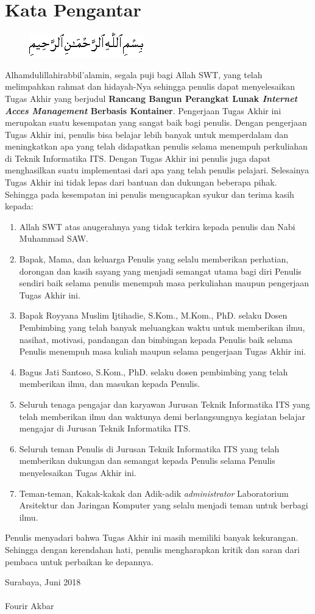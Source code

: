 \chapter{Kata Pengantar}
		\begin{figure}[h]
			\centering
			\includegraphics[width=0.5\linewidth]{img/bismillah.png}
		\end{figure}

		Alhamdulillahirabbil’alamin, segala puji bagi Allah SWT, yang telah melimpahkan rahmat dan hidayah-Nya sehingga penulis dapat menyelesaikan Tugas Akhir yang berjudul \textbf{Rancang Bangun Perangkat Lunak \textit{Internet Acces Management} Berbasis Kontainer}. Pengerjaan Tugas Akhir ini merupakan suatu kesempatan yang sangat baik bagi penulis. Dengan pengerjaan Tugas Akhir ini, penulis bisa belajar lebih banyak untuk memperdalam dan meningkatkan apa yang telah didapatkan penulis selama menempuh perkuliahan di Teknik Informatika ITS. Dengan Tugas Akhir ini penulis juga dapat menghasilkan suatu implementasi dari apa yang telah penulis pelajari.
		Selesainya Tugas Akhir ini tidak lepas dari bantuan dan dukungan beberapa pihak. Sehingga pada kesempatan ini penulis mengucapkan syukur dan terima kasih kepada:
		\begin{enumerate}
			\item Allah SWT atas anugerahnya yang tidak terkira kepada penulis dan Nabi Muhammad SAW.
			\item Bapak, Mama, dan keluarga Penulis yang selalu memberikan perhatian, dorongan dan kasih sayang yang menjadi semangat utama bagi diri Penulis sendiri baik selama penulis menempuh masa perkuliahan maupun pengerjaan Tugas Akhir ini.
			\item Bapak Royyana Muslim Ijtihadie, S.Kom., M.Kom., PhD. selaku Dosen Pembimbing yang telah banyak meluangkan waktu untuk memberikan ilmu, nasihat, motivasi, pandangan dan bimbingan kepada Penulis baik selama Penulis menempuh masa kuliah maupun selama pengerjaan Tugas Akhir ini.
			\item Bagus Jati Santoso, S.Kom., PhD. selaku dosen pembimbing yang telah memberikan ilmu, dan masukan kepada Penulis.
			\item Seluruh tenaga pengajar dan karyawan Jurusan Teknik Informatika ITS yang telah memberikan ilmu dan waktunya demi berlangsungnya kegiatan belajar mengajar di Jurusan Teknik Informatika ITS.
			\item Seluruh teman Penulis di Jurusan Teknik Informatika ITS yang telah memberikan dukungan dan semangat kepada Penulis selama Penulis menyelesaikan Tugas Akhir ini.
			\item Teman-teman, Kakak-kakak dan Adik-adik \textit{administrator} Laboratorium Arsitektur dan Jaringan Komputer yang selalu menjadi teman untuk berbagi ilmu.
		\end{enumerate}

		Penulis menyadari bahwa Tugas Akhir ini masih memiliki banyak kekurangan. Sehingga dengan kerendahan hati, penulis mengharapkan kritik dan saran dari pembaca untuk perbaikan ke depannya.

		\hfill Surabaya, Juni 2018 \\ \\
		\hfill Fourir Akbar